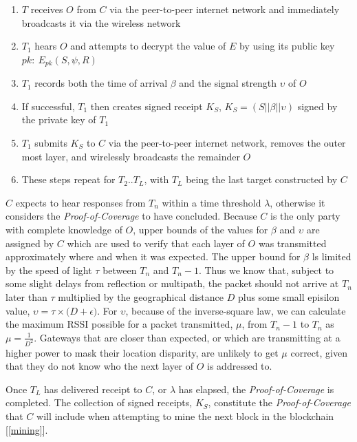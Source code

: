 \documentclass[letterpaper,11pt]{article}
\begin{document}
\begin{enumerate}
  \item $T$ receives $O$ from $C$ via the peer-to-peer internet network and immediately broadcasts it via the wireless network
  \item $T_1$ hears $O$ and attempts to decrypt the value of $E$ by using its public key $pk:\ E_{pk}\left(S, \psi, R\right)$
  \item $T_1$ records both the time of arrival $\beta$ and the signal strength $\upsilon$ of $O$
  \item If successful, $T_1$ then creates signed receipt $K_S$, $\mathit{K_S = \left(S || \beta || \upsilon\right)}$ signed by the private key of $T_1$
  \item $T_1$ submits $K_S$ to $C$ via the peer-to-peer internet network, removes the outer most layer, and wirelessly broadcasts the remainder $O$
  \item These steps repeat for $T_2$..$T_L$, with $T_L$ being the last target constructed by $C$
\end{enumerate}

$C$ expects to hear responses from $T_n$ within a time threshold $\lambda$, otherwise it considers the \emph{Proof-of-Coverage} to have concluded. Because $C$ is the only party with complete knowledge of $O$, upper bounds of the values for $\beta$ and $\upsilon$ are assigned by $C$ which are used to verify that each layer of $O$ was transmitted approximately where and when it was expected. The upper bound for $\beta$ ls limited by the speed of light $\tau$ between $T_n$ and $T_n-1$. Thus we know that, subject to some slight delays from reflection or multipath, the packet should not arrive at $T_n$ later than $\tau$ multiplied by the geographical distance $D$ plus some small episilon value, $\upsilon = \tau \times \Big(D + \epsilon\Big)$. For $\upsilon$, because of the inverse-square law, we can calculate the maximum RSSI possible for a packet transmitted, $\mu$, from $T_n-1$ to $T_n$ as $\mu = \frac{1}{D^2}$. Gateways that are closer than expected, or which are transmitting at a higher power to mask their location disparity, are unlikely to get $\mu$ correct, given that they do not know who the next layer of $O$ is addressed to.

Once $T_L$ has delivered receipt to $C$, or $\lambda$ has elapsed, the \emph{Proof-of-Coverage} is completed. The collection of signed receipts, $K_S$, constitute the \emph{Proof-of-Coverage} that $C$ will include when attempting to mine the next block in the blockchain [\ref{mining}].
\end{document}
